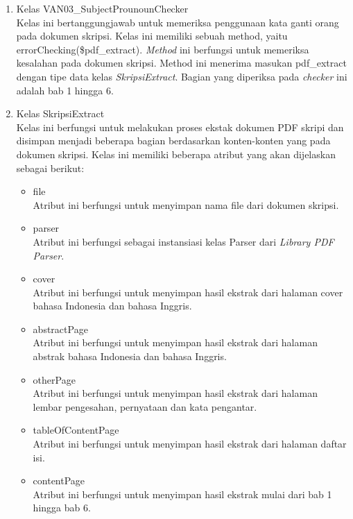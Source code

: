 \begin{enumerate}
	\item Kelas VAN03\_SubjectProunounChecker \\
	Kelas ini bertanggungjawab untuk memeriksa penggunaan kata ganti orang pada dokumen skripsi. Kelas ini memiliki sebuah method, yaitu errorChecking(\$pdf\_extract). \textit{Method} ini berfungsi untuk memeriksa kesalahan pada dokumen skripsi. Method ini menerima masukan pdf\_extract dengan tipe data kelas \textit{SkripsiExtract}. Bagian yang diperiksa pada \textit{checker} ini adalah bab 1 hingga 6.
			
	\item Kelas SkripsiExtract \\
	Kelas ini berfungsi untuk melakukan proses ekstak dokumen PDF skripi dan disimpan menjadi beberapa bagian berdasarkan konten-konten yang pada dokumen skripsi. Kelas ini memiliki beberapa atribut yang akan dijelaskan sebagai berikut:
	
		\begin{itemize}
			\item file \\
			Atribut ini berfungsi untuk menyimpan nama file dari dokumen skripsi.
			
			\item parser \\			
			Atribut ini berfungsi sebagai instansiasi kelas Parser dari \textit{Library PDF Parser}.
			
			\item cover \\
			Atribut ini berfungsi untuk menyimpan hasil ekstrak dari halaman cover bahasa Indonesia dan bahasa Inggris.
			
			\item abstractPage \\			
			Atribut ini berfungsi untuk menyimpan hasil ekstrak dari halaman abstrak bahasa Indonesia dan bahasa Inggris.
			
			\item otherPage \\
			Atribut ini berfungsi untuk menyimpan hasil ekstrak dari halaman lembar pengesahan, pernyataan dan kata pengantar.
			
			\item tableOfContentPage \\
			Atribut ini berfungsi untuk menyimpan hasil ekstrak dari halaman daftar isi.
			
			\item contentPage \\	
			Atribut ini berfungsi untuk menyimpan hasil ekstrak mulai dari bab 1 hingga bab 6.
			

\end{itemize}
\end{enumerate}
